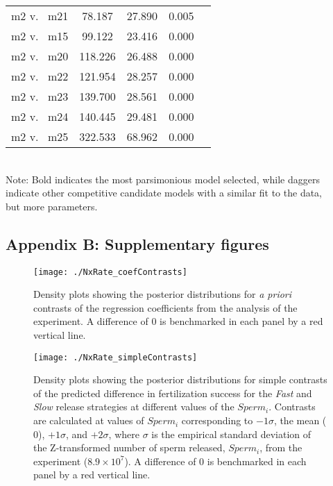 \documentclass{article}
\begin{document}
\begin{table}[!ht]
\begin{tabular}{l c c c c}
m2 v.~ m21 & 78.187  & 27.890 & 0.005 \\
m2 v.~ m15 & 99.122  & 23.416 & 0.000 \\
m2 v.~ m20 & 118.226 & 26.488 & 0.000 \\
m2 v.~ m22 & 121.954 & 28.257 & 0.000 \\
m2 v.~ m23 & 139.700 & 28.561 & 0.000 \\
m2 v.~ m24 & 140.445 & 29.481 & 0.000 \\
m2 v.~ m25 & 322.533 & 68.962 & 0.000 \\
\hline
\end{tabular}
\smallskip{} \\
{\footnotesize Note: Bold indicates the most parsimonious model selected, while daggers \\indicate other competitive candidate models with a similar fit to the data, \\but more parameters.}
\end{table}










\newpage{}

\subsection*{Appendix B: Supplementary figures}
\renewcommand{\theequation}{S\arabic{equation}}
\setcounter{equation}{0}
\renewcommand{\thefigure}{S\arabic{figure}}
\setcounter{figure}{0}

\begin{figure}[!ht]
\texttt{[image: ./NxRate\_coefContrasts]}
\caption{Density plots showing the posterior distributions for \textit{a priori} contrasts of the regression coefficients from the analysis of the  experiment. A difference of 0 is benchmarked in each panel by a red vertical line.}
\label{fig:coefContr}
\end{figure}
\newpage{}



\begin{figure}[!ht]
\texttt{[image: ./NxRate\_simpleContrasts]}
\caption{Density plots showing the posterior distributions for simple contrasts of the predicted difference in fertilization success for the \textit{Fast} and \textit{Slow} release strategies at different values of the $Sperm_i$. Contrasts are calculated at values of $Sperm_i$ corresponding to $-1 \sigma$, the mean ($0$), $+1 \sigma$, and $+2 \sigma$, where $\sigma$ is the empirical standard deviation of the Z-transformed number of sperm released, $Sperm_i$, from the  experiment ($8.9 \times 10^{7}$). A difference of 0 is benchmarked in each panel by a red vertical line.}
\label{fig:simpContr}
\end{figure}
\newpage{}
\end{document}

